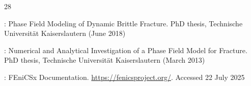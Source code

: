 \documentclass[pdflatex,sn-mathphys-num]{sn-jnl}%
\theoremstyle{thmstyleone}%
\theoremstyle{thmstyletwo}%
\theoremstyle{thmstylethree}%
\begin{document}
\begin{thebibliography}{28}
\begin{botherref}
:
Phase {{Field Modeling}} of {{Dynamic Brittle Fracture}}.
PhD thesis,
Technische Universit\"at Kaiserslautern
(June 2018)
\end{botherref}
\endbibitem

\begin{botherref}
:
Numerical and {{Analytical Investigation}} of a {{Phase Field Model}} for {{Fracture}}.
PhD thesis,
Technische Universit\"at Kaiserslautern
(March 2013)
\end{botherref}
\endbibitem

\begin{botherref}
:
FEniCSx Documentation.
\url{https://fenicsproject.org/}.
Accessed 22 July 2025
\end{botherref}
\endbibitem

\end{thebibliography}
\end{document}
